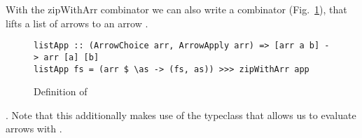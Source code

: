 With the zipWithArr combinator we can also write a combinator  (Fig.~\ref{fig:listApp}), that lifts a list of arrows \code{[arr a b]} to an arrow .
\begin{figure}[h]
\begin{lstlisting}[frame=htrbl]
listApp :: (ArrowChoice arr, ArrowApply arr) => [arr a b] -> arr [a] [b]
listApp fs = (arr $ \as -> (fs, as)) >>> zipWithArr app
\end{lstlisting}
\caption{Definition of }
\label{fig:listApp}
\end{figure}
. Note that  this additionally makes use of the  typeclass that allows us to evaluate arrows with .



